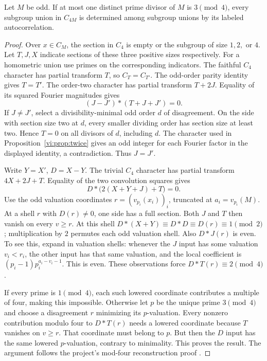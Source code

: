 \begin{proposition}\label{prop:four}
Let $M$ be odd. If at most one distinct prime divisor of $M$ is $3\pmod4$, every subgroup union in $C_{4M}$ is determined among subgroup unions by its labeled autocorrelation.
\end{proposition}
\begin{proof}
Over $x\in C_M$, the section in $C_4$ is empty or the subgroup of size $1,2,$ or $4$. Let $T,J,X$ indicate sections of these three positive sizes respectively. For a homometric union use primes on the corresponding indicators. The faithful $C_4$ character has partial transform $T$, so $C_T=C_{T'}$. The odd-order parity identity gives $T=T'$. The order-two character has partial transform $T+2J$. Equality of its squared Fourier magnitudes gives
\[
 (J-J')*(T+J+J')=0.
\]
If $J\ne J'$, select a divisibility-minimal odd order $d$ of disagreement. On the side with section size two at $d$, every smaller dividing order has section size at least two. Hence $T=0$ on all divisors of $d$, including $d$. The character used in Proposition~\ref{vi:prop:twice} gives an odd integer for each Fourier factor in the displayed identity, a contradiction. Thus $J=J'$.

Write $Y=X'$, $D=X-Y$. The trivial $C_4$ character has partial transform $4X+2J+T$. Equality of the two convolution squares gives
\[
 D*\big(2(X+Y+J)+T\big)=0.
\]
Use the odd valuation coordinates $r=(v_{p_i}(x_i))_i$, truncated at $a_i=v_{p_i}(M)$. At a shell $r$ with $D(r)\ne0$, one side has a full section. Both $J$ and $T$ then vanish on every $v\ge r$. At this shell $D*(X+Y)\equiv D*D\equiv D(r)\equiv1\pmod2$; multiplication by $2$ permutes each odd valuation shell. Also $D*J(r)$ is even. To see this, expand in valuation shells: whenever the $J$ input has some valuation $v_i<r_i$, the other input has that same valuation, and the local coefficient is $(p_i-1)p_i^{a_i-v_i-1}$. This is even. These observations force $D*T(r)\equiv2\pmod4$.

If every prime is $1\pmod4$, each such lowered coordinate contributes a multiple of four, making this impossible. Otherwise let $p$ be the unique prime $3\pmod4$ and choose a disagreement $r$ minimizing its $p$-valuation. Every nonzero contribution modulo four to $D*T(r)$ needs a lowered coordinate because $T$ vanishes on $v\ge r$. That coordinate must belong to $p$. But then the $D$ input has the same lowered $p$-valuation, contrary to minimality. This proves the result. The argument follows the project's mod-four reconstruction proof \cite{HeightFour}.
\end{proof}
